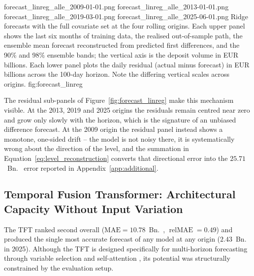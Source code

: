 \documentclass[11pt,a4paper]{article}
\begin{document}
\originsgrid
  {forecast_linreg_alle_2009-01-01.png}
  {forecast_linreg_alle_2013-01-01.png}
  {forecast_linreg_alle_2019-03-01.png}
  {forecast_linreg_alle_2025-06-01.png}
  {Ridge forecasts with the full covariate set at the four rolling origins.
   Each upper panel shows the last six months of training data, the realised
   out-of-sample path, the ensemble mean forecast reconstructed from predicted
   first differences, and the 90\% and 98\% ensemble bands; the vertical axis
   is the deposit volume in EUR billions. Each lower panel plots the daily
   residual (actual minus forecast) in EUR billions across the 100-day
   horizon. Note the differing vertical scales across origins.}
  {fig:forecast_linreg}

The residual sub-panels of Figure~\ref{fig:forecast_linreg} make this
mechanism visible. At the 2013, 2019 and 2025 origins the residuals remain
centred near zero and grow only slowly with the horizon, which is the
signature of an unbiased difference forecast. At the 2009 origin the residual
panel instead shows a monotone, one-sided drift -- the model is not noisy
there, it is systematically wrong about the direction of the level, and the
summation in Equation~\eqref{eq:level_reconstruction} converts that directional
error into the $25.71$~Bn.~\texteuro{} error reported in
Appendix~\ref{app:additional}.

\subsection{Temporal Fusion Transformer: Architectural Capacity Without Input Variation}
The TFT ranked second overall ($\text{MAE} = 10.78$~Bn.~\texteuro,
$\operatorname{relMAE} = 0.49$) and produced the single most accurate forecast
of any model at any origin ($2.43$~Bn.~\texteuro{} in 2025). Although the TFT
is designed specifically for multi-horizon forecasting through variable
selection and self-attention \citep{lim2021}, its potential was structurally
constrained by the evaluation setup.
\end{document}
